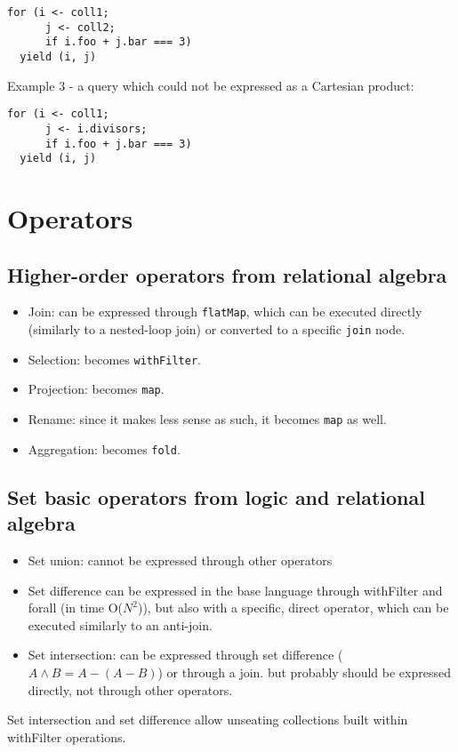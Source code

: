 \documentclass[preprint,authoryear,10pt]{sigplanconf}
\newcommand{\intersect}{\wedge}
\begin{document}
\begin{lstlisting}
for (i <- coll1;
      j <- coll2;
      if i.foo + j.bar === 3)
  yield (i, j)
\end{lstlisting}
Example 3 - a query which could not be expressed as a Cartesian product:

\begin{lstlisting}
for (i <- coll1;
      j <- i.divisors;
      if i.foo + j.bar === 3)
  yield (i, j)
\end{lstlisting}
\section{Operators}

\subsection{Higher-order operators from relational algebra}

\begin{itemize}
\item
  Join: can be expressed through \texttt{flatMap}, which can be executed
  directly (similarly to a nested-loop join) or converted to a specific
  \texttt{join} node.
\item
  Selection: becomes \texttt{withFilter}.
\item
  Projection: becomes \texttt{map}.
\item
  Rename: since it makes less sense as such, it becomes \texttt{map} as
  well.
\item
  Aggregation: becomes \texttt{fold}.
\end{itemize}
\subsection{Set basic operators from logic and relational algebra}

\begin{itemize}
\item
  Set union: cannot be expressed through other operators
\item
  Set difference can be expressed in the base language through
  withFilter and forall (in time O($N^2$)), but also with a specific,
  direct operator, which can be executed similarly to an anti-join.
\item
  Set intersection: can be expressed through set difference
  ($A \intersect B = A - (A - B)$) or through a join. but probably
  should be expressed directly, not through other operators.
\end{itemize}
Set intersection and set difference allow unseating collections built
within withFilter operations.
\end{document}
